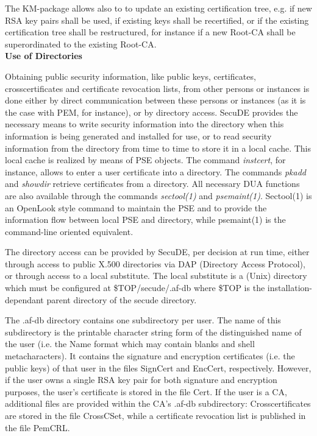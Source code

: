 The KM-package allows also to 
to update an existing certification tree, e.g. if new RSA key pairs shall be used,
if existing keys shall be recertified, or if the existing certification tree shall be 
restructured, for instance if a new Root-CA shall be superordinated to the 
existing Root-CA.
\\ [1em]
{\bf Use of Directories} 
 
Obtaining public security information, like public keys, certificates,
crosscertificates and certificate revocation lists, from other persons or instances is
done either by direct communication between these persons or instances (as it
is the case with PEM, for instance), or by directory access. SecuDE provides the
necessary means to write security information into the directory when this
information is being generated and installed for use, or to read security
information from the directory from time to time to store it in a local cache.
This local cache is realized by means of PSE objects. 
The command {\em instcert}, for instance, allows to enter a user
certificate into a directory. The commands {\em pkadd} and {\em showdir}
retrieve certificates from a directory. All necessary DUA functions are
also available through the commands {\em sectool(1)} and {\em psemaint(1)}.
Sectool(1) is an OpenLook style command to maintain the PSE and to provide
the information flow between local PSE and directory, while psemaint(1) is the 
command-line oriented equivalent.

The directory access can be provided 
by SecuDE, per decision at run time, either through access to public
X.500 directories via DAP (Directory Access Protocol), or through access
to a local substitute. The local substitute is a (Unix) directory
which must be configured at \$TOP/secude/.af-db where \$TOP
is the installation-dependant parent directory of the secude directory. 
 
The .af-db directory contains one subdirectory per user. The name of this
subdirectory is the printable character string form of the distinguished name of the user (i.e.
the Name format which may contain blanks and shell metacharacters). It
contains the signature and encryption certificates (i.e. the public
keys) of that user in the files SignCert and EncCert, respectively. However, if the user owns a single 
RSA key pair for both signature and encryption purposes, the user's certificate is stored in the file
Cert.
If the user is a CA, additional files are provided within the CA's .af-db subdirectory: Crosscertificates 
are stored in the
file CrossCSet, while a certificate revocation list is published in the file PemCRL.
 
